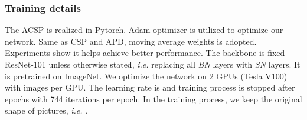 \documentclass[twocolumn]{article}
\begin{document}
\subsubsection{Training details}
The ACSP is realized in Pytorch\cite{paszke2017automatic}. Adam\cite{kingma2014adam} optimizer is utilized to optimize our network. Same as CSP\cite{liu2019high} and APD\cite{DBLP:journals/corr/abs-1910-09188}, moving average weights\cite{tarvainen2017mean} is adopted. Experiments show it helps achieve better performance. The backbone is fixed ResNet-101\cite{luo2018differentiable} unless otherwise stated, \textit{i.e.} replacing all \textit{BN} layers with \textit{SN} layers. It is pretrained on ImageNet\cite{deng2009imagenet}. We optimize the network on 2 GPUs (Tesla V100) with  images per GPU. The learning rate is  and training process is stopped after  epochs with 744 iterations per epoch. In the training process, we keep the original shape of pictures, \textit{i.e.} . 
\end{document}
